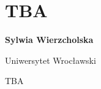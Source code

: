 \documentclass[\main/boa.tex]{subfiles}
\begin{document}
\section{TBA}

\begin{minipage}{0.915\textwidth}
	\centering
  {\bf {}  Sylwia Wierzcholska}
\end{minipage}


\begin{affiliations}
\begin{minipage}{0.915\textwidth}
\centering
Uniwersytet Wrocławski  \\[-2pt]
\end{minipage}
\end{affiliations}

\vskip 0.3cm

TBA
\end{document}
